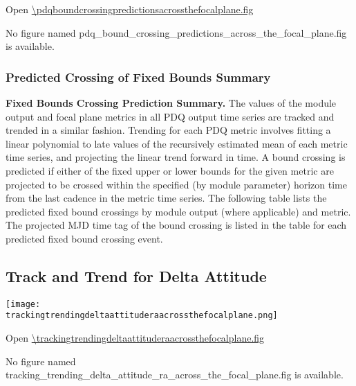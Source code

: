 Open \url{\pdqboundcrossingpredictionsacrossthefocalplane.fig}

\else
No figure named
pdq\_bound\_crossing\_predictions\_across\_the\_focal\_plane.fig is
available.
\fi

\clearpage

\subsubsection{Predicted Crossing of Fixed Bounds Summary}

{\bf Fixed Bounds Crossing Prediction Summary.} The values of the
module output and focal plane metrics in all PDQ output time series
are tracked and trended in a similar fashion. Trending for each PDQ
metric involves fitting a linear polynomial to late values of the
recursively estimated mean of each metric time series, and projecting
the linear trend forward in time. A bound crossing is predicted if
either of the fixed upper or lower bounds for the given metric are
projected to be crossed within the specified (by module parameter)
horizon time from the last cadence in the metric time series. The
following table lists the predicted fixed bound crossings by module
output (where applicable) and metric. The projected MJD time tag of
the bound crossing is listed in the table for each predicted fixed
bound crossing event.


\clearpage

\subsection{Track and Trend for Delta Attitude}

\ifdefined \trackingtrendingdeltaattituderaacrossthefocalplane

\begin{center}
  \texttt{[image: \\trackingtrendingdeltaattituderaacrossthefocalplane.png]}
\end{center}

Open \url{\trackingtrendingdeltaattituderaacrossthefocalplane.fig}

\else
No figure named
tracking\_trending\_delta\_attitude\_ra\_across\_the\_focal\_plane.fig
is available.
\fi

